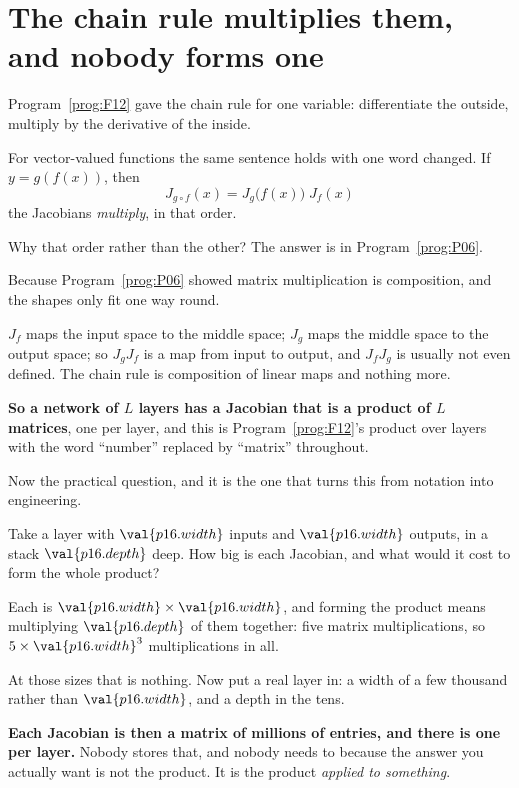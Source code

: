 \section{The chain rule multiplies them, and nobody forms one}
\label{sec:P16-chain}

\begin{fr}
Program~\ref{prog:F12} gave the chain rule for one variable: differentiate the
outside, multiply by the derivative of the inside.

For vector-valued functions the same sentence holds with one word changed.
If $y = g(f(x))$, then
\[ J_{g \circ f}(x) = J_g\bigl(f(x)\bigr)\; J_f(x) \]
\dash{} the Jacobians \emph{multiply}, in that order.

Why that order rather than the other? The answer is in
Program~\ref{prog:P06}.
\dotline
\nextframe
\end{fr}

\begin{fr}
\begin{ansblock}
Because Program~\ref{prog:P06} showed matrix multiplication is composition,
and the shapes only fit one way round.
\end{ansblock}

$J_f$ maps the input space to the middle space; $J_g$ maps the middle space to
the output space; so $J_g J_f$ is a map from input to output, and $J_f J_g$ is
usually not even defined. The chain rule is composition of linear maps and
nothing more.

\textbf{So a network of $L$ layers has a Jacobian that is a product of $L$
matrices}, one per layer, and this is Program~\ref{prog:F12}'s product over
layers with the word \enquote{number} replaced by \enquote{matrix} throughout.
\end{fr}

\begin{fr}
Now the practical question, and it is the one that turns this from notation
into engineering.

Take a layer with $\val{p16.width}$ inputs and $\val{p16.width}$ outputs, in
a stack $\val{p16.depth}$ deep. How big is each Jacobian, and what would it
cost to form the whole product?
\dotline
\nextframe
\end{fr}

\begin{fr}
\begin{ansblock}
Each is $\val{p16.width} \times \val{p16.width}$, and forming the product means
multiplying $\val{p16.depth}$ of them together: five matrix multiplications, so
$5 \times \val{p16.width}^{3}$ multiplications in all.
\end{ansblock}

At those sizes that is nothing. Now put a real layer in: a width of a few
thousand rather than $\val{p16.width}$, and a depth in the tens.

\textbf{Each Jacobian is then a matrix of millions of entries, and there is one
per layer.} Nobody stores that, and nobody needs to \dash{} because the answer
you actually want is not the product. It is the product \emph{applied to
something}.
\end{fr}

